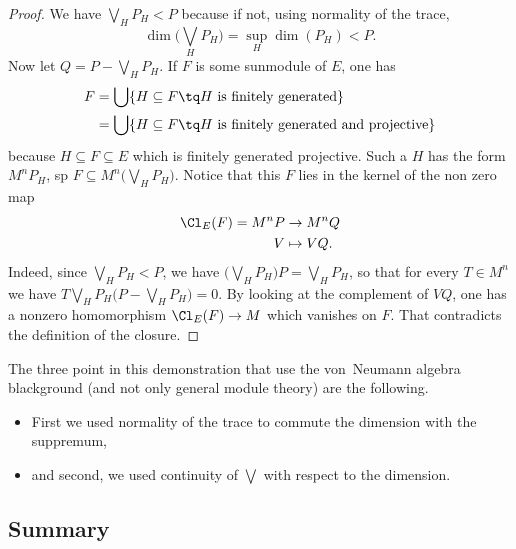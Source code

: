 \begin{proof}
We have $\bigvee_HP_H<P$ because if not, using normality of the trace,
\begin{equation}
	\dim\big( \bigvee_HP_H \big)=\sup_H\dim(P_H)<P.
\end{equation}
Now let $Q=P-\bigvee_HP_H$. If $F$ is some sunmodule of $E$, one has
\begin{equation}
\begin{split}
	F&=\bigcup\{ H\subseteq F\tq \text{$H$ is finitely generated} \}\\
	&=\bigcup\{ H\subseteq F\tq \text{$H$ is finitely generated and projective} \}
\end{split}
\end{equation}
because $H\subseteq F\subseteq E$ which is finitely generated projective. Such a $H$ has the form $M^nP_H$, sp $F\subseteq M^n\big( \bigvee_HP_H \big)$. Notice that this $F$ lies in the kernel of the non zero map
\begin{equation}
\begin{aligned}
 \Cl_E(F)=M^nP&\to M^nQ \\ 
   V&\mapsto VQ. 
\end{aligned}
\end{equation}
Indeed, since $\bigvee_HP_H<P$, we have $\big( \bigvee_HP_H \big)P=\bigvee_HP_H$, so that for every $T\in M^n$ we have $T\bigvee_HP_H\big( P-\bigvee_HP_H \big)=0$. By looking at the complement of $VQ$, one has a nonzero homomorphism $ \Cl_E(F)\to M$ which vanishes on $F$. That contradicts the definition of the closure.

\end{proof}

The three point in this demonstration that use the von~Neumann algebra blackground (and not only general module theory) are the following.
\begin{itemize}
\item First we used normality of the trace to commute the dimension with the suppremum,
\item and second, we used continuity of $\bigvee$ with respect to the dimension.
\end{itemize}

					\subsection{Summary}

